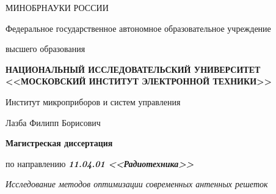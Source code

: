 \thispagestyle{empty}
\setcounter{page}{1}

\begin{center}
    МИНОБРНАУКИ РОССИИ

    \vspace{1ex}

    Федеральное государственное автономное образовательное учреждение 
    
    высшего образования

    \textbf{НАЦИОНАЛЬНЫЙ ИССЛЕДОВАТЕЛЬСКИЙ УНИВЕРСИТЕТ <<МОСКОВСКИЙ ИНСТИТУТ ЭЛЕКТРОННОЙ ТЕХНИКИ>>}

    \vspace{1ex}

    Институт микроприборов и систем управления
\end{center}

\vspace{17ex}

\begin{center}
    Лазба Филипп Борисович 
    
    \vspace{1ex}
    \textbf{Магистреская диссертация}

    по направлению
    \textbf{\textit{11.04.01 <<Радиотехника>>}}
    
    \vspace{1ex}
    \textit{Исследование методов оптимизации современных антенных решеток}

\end{center}

\vspace{25ex}



